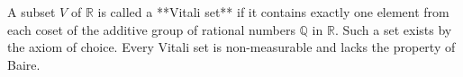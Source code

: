 A subset $V$ of $\mathbb{R}$ is called a **Vitali set** if it contains exactly one element from each coset of the additive group of rational numbers $\mathbb{Q}$ in $\mathbb{R}$. Such a set exists by the axiom of choice. Every Vitali set is non-measurable and lacks the property of Baire.